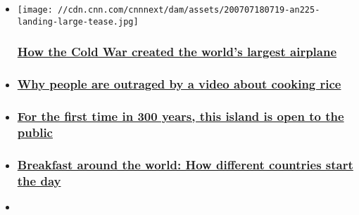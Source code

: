 \begin{itemize}
\item
  \href{/travel/article/an-225-worlds-largest-airplane/index.html}{}

  \texttt{[image: //cdn.cnn.com/cnnnext/dam/assets/200707180719-an225-landing-large-tease.jpg]}

  \hypertarget{how-the-cold-war-created-the-worlds-largest-airplane}{%
  \subsubsection{\texorpdfstring{\href{/travel/article/an-225-worlds-largest-airplane/index.html}{How
  the Cold War created the world's largest
  airplane}}{How the Cold War created the world's largest airplane}}\label{how-the-cold-war-created-the-worlds-largest-airplane}}
\item
  \hypertarget{why-people-are-outraged-by-a-video-about-cooking-rice}{%
  \subsubsection{\texorpdfstring{\href{/travel/article/uncle-roger-rice-food-appropriation-intl-hnk/index.html}{Why
  people are outraged by a video about cooking
  rice}}{Why people are outraged by a video about cooking rice}}\label{why-people-are-outraged-by-a-video-about-cooking-rice}}
\item
  \hypertarget{for-the-first-time-in-300-years-this-island-is-open-to-the-public-}{%
  \subsubsection{\texorpdfstring{\href{/travel/article/cape-cod-island-open-for-first-time-in-300-years-trnd/index.html}{For
  the first time in 300 years, this island is open to the public
  }}{For the first time in 300 years, this island is open to the public }}\label{for-the-first-time-in-300-years-this-island-is-open-to-the-public-}}
\item
  \hypertarget{breakfast-around-the-world-how-different-countries-start-the-day}{%
  \subsubsection{\texorpdfstring{\href{/travel/article/breakfast-food-around-the-world/index.html}{Breakfast
  around the world: How different countries start the
  day}}{Breakfast around the world: How different countries start the day}}\label{breakfast-around-the-world-how-different-countries-start-the-day}}
\item
  \hypertarget{these-two-boats-show-the-difference-between-the-us-and-canadas-covid-19-responses}{%
}
\end{itemize}
